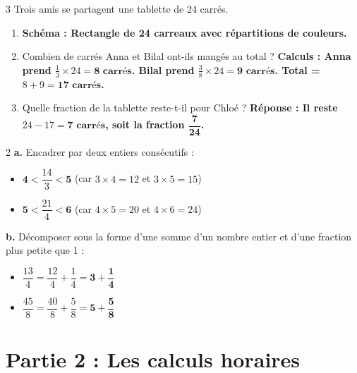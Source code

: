 \documentclass[a4paper]{book}
\begin{document}
{        
    \begin{exerciceNote}{3}
        Trois amis se partagent une tablette de 24 carrés.
        \begin{enumerate}
            \item \textbf{Schéma : Rectangle de 24 carreaux avec répartitions de couleurs.}
            \item Combien de carrés Anna et Bilal ont-ils mangés au total ? \newline
            \textbf{Calculs : Anna prend $\frac{1}{3} \times 24 = \mathbf{8\text{ carrés}}$. Bilal prend $\frac{3}{8} \times 24 = \mathbf{9\text{ carrés}}$. Total = $8 + 9 = \mathbf{17\text{ carrés}}$.}
            \item Quelle fraction de la tablette reste-t-il pour Chloé ? \newline
            \textbf{Réponse : Il reste $24 - 17 = \mathbf{7\text{ carrés}}$, soit la fraction $\mathbf{\dfrac{7}{24}}$.}
        \end{enumerate}
    \end{exerciceNote} 

    
    \begin{exerciceNote}{2}    
        \textbf{a.} Encadrer par deux entiers consécutifs : \newline
        \begin{itemize}
            \item[] $\mathbf{4} < \dfrac{14}{3} < \mathbf{5}$ \quad (car $3 \times 4 = 12$ et $3 \times 5 = 15$)
            \item[] $\mathbf{5} < \dfrac{21}{4} < \mathbf{6}$ \quad (car $4 \times 5 = 20$ et $4 \times 6 = 24$)
        \end{itemize}
        
        \textbf{b.} Décomposer sous la forme d'une somme d'un nombre entier et d'une fraction plus petite que 1 : \newline
        \begin{itemize}
            \item[] $\dfrac{13}{4} = \dfrac{12}{4} + \dfrac{1}{4} = \mathbf{3 + \dfrac{1}{4}}$
            \item[] $\dfrac{45}{8} = \dfrac{40}{8} + \dfrac{5}{8} = \mathbf{5 + \dfrac{5}{8}}$
        \end{itemize}
    \end{exerciceNote}

    
\section*{Partie 2 : Les calculs horaires}

}
\end{document}
